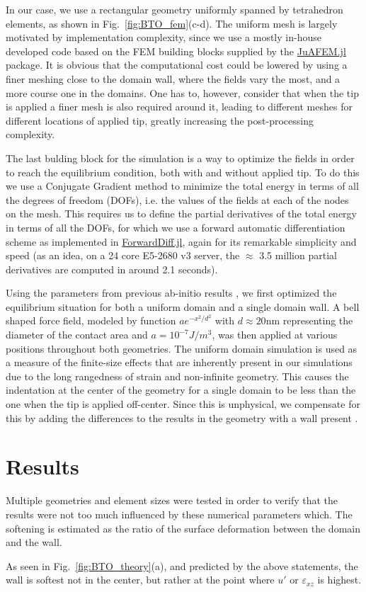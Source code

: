 In our case, we use a rectangular geometry uniformly spanned by tetrahedron elements, as shown in Fig.~\ref{fig:BTO_fem}(c-d).
The uniform mesh is largely motivated by implementation complexity, since we use a mostly in-house developed code based on the FEM building blocks supplied by the \href{https://github.com/KristofferC/JuAFEM.jl}{JuAFEM.jl} package.
It is obvious that the computational cost could be lowered by using a finer meshing close to the domain wall, where the fields vary the most, and a more course one in the domains.
One has to, however, consider that when the tip is applied a finer mesh is also required around it, leading to different meshes for different locations of applied tip, greatly increasing the post-processing complexity.

The last bulding block for the simulation is a way to optimize the fields in order to reach the equilibrium condition, both with and without applied tip.
To do this we use a Conjugate Gradient method to minimize the total energy in terms of all the degrees of freedom (DOFs), i.e. the values of the fields at each of the nodes on the mesh.
This requires us to define the partial derivatives of the total energy in terms of all the DOFs, for which we use a forward automatic differentiation scheme as implemented in \href{www.juliadiff.org/ForwardDiff.jl/latest/}{ForwardDiff.jl}, again for its remarkable simplicity and speed (as an idea, on a 24 core E5-2680 v3 server, the $\approx$ 3.5 million partial derivatives are computed in around 2.1 seconds).

Using the parameters from previous ab-initio results \cite{Marton2010}, we first optimized the equilibrium situation for both a uniform domain and a single domain wall.
A bell shaped force field, modeled by function $a e^{-x^2/d^2}$ with $d \approx 20$nm representing the diameter of the contact area and $a = 10^{-7} J/m^3$, was then applied at various positions throughout both geometries.
The uniform domain simulation is used as a measure of the finite-size effects that are inherently present in our simulations due to the long rangedness of strain and non-infinite geometry.
This causes the indentation at the center of the geometry for a single domain to be less than the one when the tip is applied off-center.
Since this is unphysical, we compensate for this by adding the differences to the results in the geometry with a wall present .

\section{Results}
Multiple geometries and element sizes were tested in order to verify that the results were not too much influenced by these numerical parameters which. 
The softening is estimated as the ratio of the surface deformation between the domain and the wall.

As seen in Fig.~\ref{fig:BTO_theory}(a), and predicted by the above statements, the wall is softest not in the center, but rather at the point where $u'$ or $\varepsilon_{xz}$ is highest.

\printbibliography
